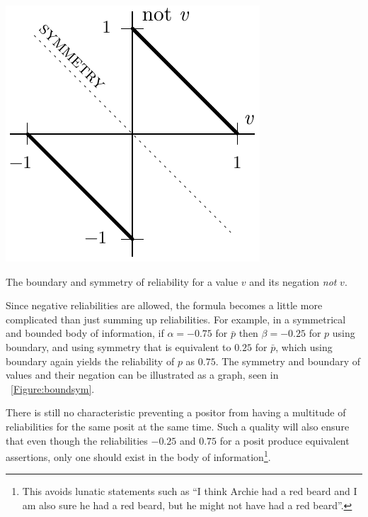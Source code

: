 \documentclass[sfsidenotes,nobib,twoside,symmetric]{tufte-handout}
\begin{document}
\begin{marginfigure}
\centering
\includegraphics[width=\linewidth]{v_and_not_v.pdf}
\caption{The boundary and symmetry of reliability for a value $v$ and its negation \emph{not} $v$.}
\label{Figure:boundsym}
\end{marginfigure}
Since negative reliabilities are allowed, the formula becomes a little more complicated than just summing up reliabilities. 
For example, in a symmetrical and bounded body of information, if $\alpha = -0.75$ for $\bar{p}$ then $\beta = -0.25$ for $p$ using boundary, and using symmetry that is equivalent to $0.25$ for $\bar{p}$, which using boundary again yields the reliability of $p$ as $0.75$. The symmetry and boundary of values and their negation can be illustrated as a graph, seen in \figurename~\ref{Figure:boundsym}.

There is still no characteristic preventing a positor from having a multitude of reliabilities for the same posit at the same time. Such a quality will also ensure that even though the reliabilities $-0.25$ and $0.75$ for a posit produce equivalent assertions, only one should exist in the body of information\footnote{This avoids lunatic statements such as \enquote{I think Archie had a red beard and I am also sure he had a red beard, but he might not have had a red beard}.}.
\end{document}
